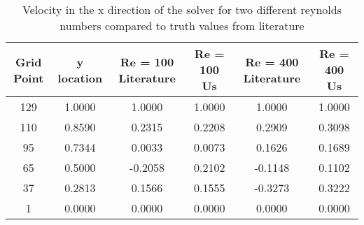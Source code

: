 \begin{table*}
	\begin{center}
		\begin{tabular} { |c|c|c|c|c|c| }

\hline			Grid Point & y location & Re = 100 Literature & Re = 100 Us & Re = 400 Literature & Re = 400 Us\\ \hline 
			129 & 1.0000 & 1.0000 & 1.0000 & 1.0000 & 1.0000\\ \hline 
			110 & 0.8590 & 0.2315 & 0.2208 & 0.2909 & 0.3098\\ \hline 
			95 & 0.7344 & 0.0033 & 0.0073 & 0.1626 & 0.1689\\ \hline 
			65 & 0.5000 & -0.2058 & 0.2102 & -0.1148 & 0.1102\\ \hline 
			37 & 0.2813 & 0.1566 & 0.1555 & -0.3273 & 0.3222\\ \hline 
			1 & 0.0000 & 0.0000 & 0.0000 & 0.0000 & 0.0000\\ \hline 
		\end{tabular}
		\caption{Velocity in the x direction of the solver for two different reynolds numbers compared to truth values from literature}
		\label{table_u_vel}
	\end{center}
\end{table*}
